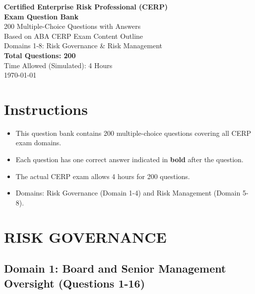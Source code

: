 \documentclass[12pt, letterpaper]{article}
\begin{document}
\begin{center}
    \vspace*{1cm}
    {\huge \textbf{Certified Enterprise Risk Professional (CERP)}} \\[0.5cm]
    {\huge \textbf{Exam Question Bank}} \\[1cm]
    {\Large 200 Multiple-Choice Questions with Answers} \\[1.5cm]
    {\large Based on ABA CERP Exam Content Outline} \\[0.3cm]
    {\large Domains 1-8: Risk Governance \& Risk Management} \\[2cm]
    {\large \textbf{Total Questions: 200}} \\[0.3cm]
    {\large Time Allowed (Simulated): 4 Hours} \\[2cm]
    \vfill
    {\large \today}
\end{center}

\newpage

\section*{Instructions}
\begin{itemize}
    \item This question bank contains 200 multiple-choice questions covering all CERP exam domains.
    \item Each question has one correct answer indicated in \textbf{bold} after the question.
    \item The actual CERP exam allows 4 hours for 200 questions.
    \item Domains: Risk Governance (Domain 1-4) and Risk Management (Domain 5-8).
\end{itemize}
\newpage

\section{RISK GOVERNANCE}

\subsection{Domain 1: Board and Senior Management Oversight (Questions 1-16)}
\end{document}
